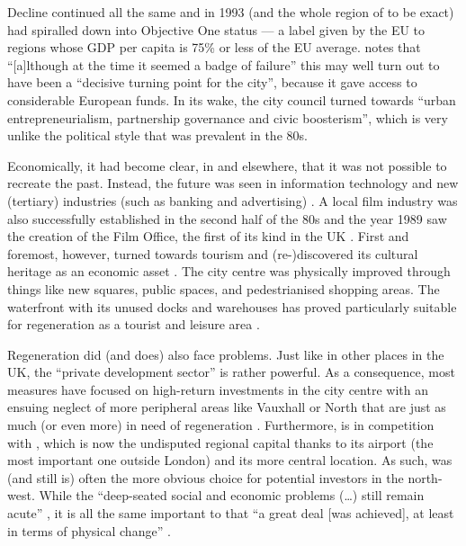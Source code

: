 Decline continued all the same and in 1993  (and the whole region of  to be exact) had spiralled down into Objective One status --- a label given by the EU to regions whose GDP per capita is 75\% or less of the EU average.
\citet[53--54]{belchem2006a} notes that ``[a]lthough at the time it seemed a badge of failure'' this may well turn out to have been a ``decisive turning point for the city'', because it gave access to considerable European funds.
In its wake, the city council turned towards ``urban entrepreneurialism, partnership governance and civic boosterism'', which is very unlike the political style that was prevalent in the 80s.

Economically, it had become clear, in  and elsewhere, that it was not possible to recreate the past.
Instead, the future was seen in information technology and new (tertiary) industries (such as banking and advertising) \citep[cf.][32]{fraser2003}.
A local film industry was also successfully established in the second half of the 80s and the year 1989 saw the creation of the  Film Office, the first of its kind in the UK \citep[cf.][479]{murden2006}.
First and foremost, however,  turned towards tourism and (re-)discovered its cultural heritage as an economic asset \citep[cf.][32--33]{fraser2003}.
The city centre was physically improved through things like new squares, public spaces, and pedestrianised shopping areas.
The waterfront with its unused docks and warehouses has proved particularly suitable for regeneration as a tourist and leisure area \citep[173--174]{couch2003a}.

Regeneration did (and does) also face problems.
Just like in other places in the UK, the ``private development sector'' is rather powerful.
As a consequence, most measures have focused on high-return investments in the city centre with an ensuing neglect of more peripheral areas like Vauxhall or North  that are just as much (or even more) in need of regeneration \citep[cf.][49]{couch2003}.
Furthermore,  is in competition with , which is now the undisputed regional capital thanks to its airport (the most important one outside London) and its more central location.
As such,  was (and still is) often the more obvious choice for potential investors in the north-west.
While the ``deep-seated social and economic problems (\ldots) still remain acute'' \citep[188]{fraser2003a}, it is all the same important to  that ``a great deal [was achieved], at least in terms of physical change'' \citep[44]{couch2003}.

